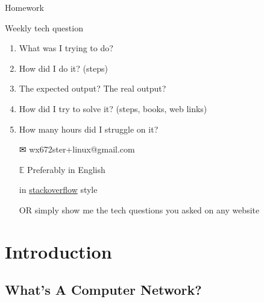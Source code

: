 \begin{frame}{{\hw\enspace}Homework}
  \begin{block}{Weekly tech question}
    \begin{enumerate}
    \item What was I trying to do?
    \item How did I do it? (steps)
    \item The expected output? The real output?
    \item How did I try to solve it? (steps, books, web links)
    \item How many hours did I struggle on it?
    \end{enumerate}
  \end{block}
  \begin{itemize}
  \item[\Large\dejavu ✉] \alert{\ttfamily wx672ster+linux@gmail.com}
  \item[$\mathbb{E}$] Preferably in English
  \item[\stackoverflow] in
    \href{https://stackoverflow.com/questions/39199299/what-is-the-essential-difference-between-compound-command-and-normal-command-inlink}{stackoverflow}
    style
  \item[OR] simply show me the tech questions you asked on any website
  \end{itemize}  
\end{frame}

\section{Introduction}

\subsection[Definition]{What's A Computer Network?}

